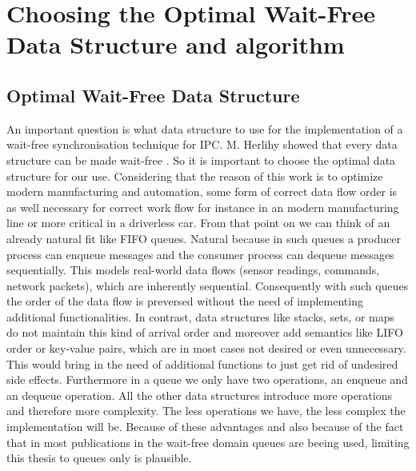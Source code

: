 \chapter{Choosing the Optimal Wait-Free Data Structure and algorithm}\label{ch:choosing-the-optimal-wait-free-data-structure}

\section{Optimal Wait-Free Data Structure}\label{sec:optimal-wait-free-data-structure}

An important question is what data structure to use for the implementation of a wait-free synchronisation technique for \ac{IPC}. M. Herlihy showed that every data structure can be made wait-free \cite{herlihy1991wait}. So it is important to choose the optimal data structure for our use. Considering that the reason of this work is to optimize modern manufacturing and automation, some form of correct data flow order is as well necessary for correct work flow for instance in an modern manufacturing line or more critical in a driverless car. From that point on we can think of an already natural fit like \ac{FIFO} queues. Natural because in such queues a producer process can enqueue messages and the consumer process can dequeue messages sequentially. This models real-world data flows (sensor readings, commands, network packets), which are inherently sequential. Consequently with such queues the order of the data flow is preversed without the need of implementing additional functionalities. In contrast, data structures like stacks, sets, or maps do not maintain this kind of arrival order and moreover add semantics like \ac{LIFO} order or key-value pairs, which are in most cases not desired or even unnecessary. This would bring in the need of additional functions to just get rid of undesired side effects. Furthermore in a queue we only have two operations, an enqueue and an dequeue operation. All the other data structures introduce more operations and therefore more complexity. The less operations we have, the less complex the implementation will be. Because of these advantages and also because of the fact that in most publications in the wait-free domain queues are beeing used, limiting this thesis to queues only is plausible. \cite{jiffy}

